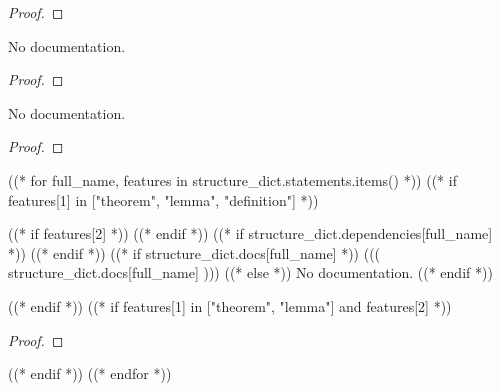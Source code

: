 \begin{proof}
    \leanok
\end{proof}

\begin{theorem}\label{HasGradientAt.const_mul'}
        \leanok
                No documentation.
    \end{theorem}

\begin{proof}
    \leanok
\end{proof}

\begin{theorem}\label{gradient_const_mul'}
        \leanok
                No documentation.
    \end{theorem}

\begin{proof}
    \leanok
\end{proof}




((* for full_name, features in structure_dict.statements.items() *))
((* if features[1] in ["theorem", "lemma", "definition"] *))
\begin{((( features[1] )))}\label{((( full_name )))}
    ((* if features[2] *))
    \leanok
    ((* endif *))
    ((* if structure_dict.dependencies[full_name] *))
    ((* endif *))
    ((* if structure_dict.docs[full_name] *))
        ((( structure_dict.docs[full_name] )))
    ((* else *))
        No documentation.
    ((* endif *))
\end{((( features[1] )))}

((* endif *))
((* if features[1] in ["theorem", "lemma"] and features[2] *))
\begin{proof}
    \leanok
\end{proof}

((* endif *))
((* endfor *))
